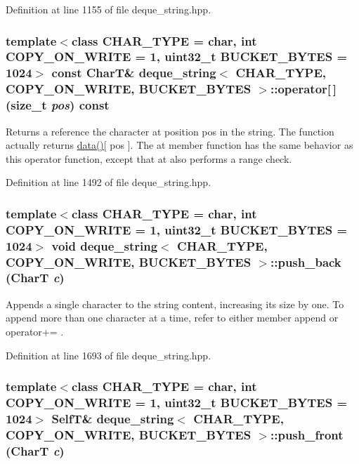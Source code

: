 Definition at line 1155 of file deque\_\-string.hpp.\hypertarget{classdeque__string_88832ed720e934d637d0b8b9205e29a5}{
\subsubsection[{operator[]}]{\setlength{\rightskip}{0pt plus 5cm}template$<$class CHAR\_\-TYPE  = char, int COPY\_\-ON\_\-WRITE = 1, uint32\_\-t BUCKET\_\-BYTES = 1024$>$ const CharT\& {\bf deque\_\-string}$<$ CHAR\_\-TYPE, COPY\_\-ON\_\-WRITE, BUCKET\_\-BYTES $>$::operator\mbox{[}$\,$\mbox{]} (size\_\-t {\em pos}) const}}
\label{classdeque__string_88832ed720e934d637d0b8b9205e29a5}


Returns a reference the character at position pos in the string. The function actually returns \hyperlink{classdeque__string_43d0a5c5653559cee6bd477fce3f0a2c}{data()}\mbox{[} pos \mbox{]}. The at member function has the same behavior as this operator function, except that at also performs a range check. 

Definition at line 1492 of file deque\_\-string.hpp.\hypertarget{classdeque__string_c6bb97ddcf4da6d778782a90dabb1866}{
\subsubsection[{push\_\-back}]{\setlength{\rightskip}{0pt plus 5cm}template$<$class CHAR\_\-TYPE  = char, int COPY\_\-ON\_\-WRITE = 1, uint32\_\-t BUCKET\_\-BYTES = 1024$>$ void {\bf deque\_\-string}$<$ CHAR\_\-TYPE, COPY\_\-ON\_\-WRITE, BUCKET\_\-BYTES $>$::push\_\-back (CharT {\em c})}}
\label{classdeque__string_c6bb97ddcf4da6d778782a90dabb1866}


Appends a single character to the string content, increasing its size by one. To append more than one character at a time, refer to either member append or operator+= . 

Definition at line 1693 of file deque\_\-string.hpp.\hypertarget{classdeque__string_0c68ec4134f82d210d03599c5ec161e8}{
\subsubsection[{push\_\-front}]{\setlength{\rightskip}{0pt plus 5cm}template$<$class CHAR\_\-TYPE  = char, int COPY\_\-ON\_\-WRITE = 1, uint32\_\-t BUCKET\_\-BYTES = 1024$>$ {\bf SelfT}\& {\bf deque\_\-string}$<$ CHAR\_\-TYPE, COPY\_\-ON\_\-WRITE, BUCKET\_\-BYTES $>$::push\_\-front (CharT {\em c})}}
\label{classdeque__string_0c68ec4134f82d210d03599c5ec161e8}


